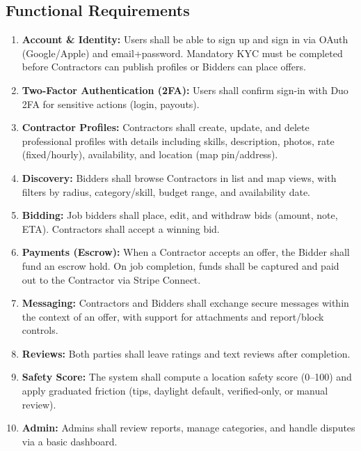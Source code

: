 \documentclass[11pt]{article}
\begin{document}
\subsection{Functional Requirements}
\begin{enumerate}[leftmargin=1.4em]
  \item \textbf{Account \& Identity:} Users shall be able to sign up and sign in via OAuth (Google/Apple) and email+password. Mandatory KYC must be completed before Contractors can publish profiles or Bidders can place offers.
  \item \textbf{Two-Factor Authentication (2FA):} Users shall confirm sign-in with Duo 2FA for sensitive actions (login, payouts).
  \item \textbf{Contractor Profiles:} Contractors shall create, update, and delete professional profiles with details including skills, description, photos, rate (fixed/hourly), availability, and location (map pin/address).
  \item \textbf{Discovery:} Bidders shall browse Contractors in list and map views, with filters by radius, category/skill, budget range, and availability date.
  \item \textbf{Bidding:} Job bidders shall place, edit, and withdraw bids (amount, note, ETA). Contractors shall accept a winning bid.
  \item \textbf{Payments (Escrow):}  When a Contractor accepts an offer, the Bidder shall fund an escrow hold. On job completion, funds shall be captured and paid out to the Contractor via Stripe Connect.
  \item \textbf{Messaging:} Contractors and Bidders shall exchange secure messages within the context of an offer, with support for attachments and report/block controls.
  \item \textbf{Reviews:} Both parties shall leave ratings and text reviews after completion.
  \item \textbf{Safety Score:} The system shall compute a location safety score (0--100) and apply graduated friction (tips, daylight default, verified-only, or manual review).
  \item \textbf{Admin:} Admins shall review reports, manage categories, and handle disputes via a basic dashboard.
\end{enumerate}
\end{document}

